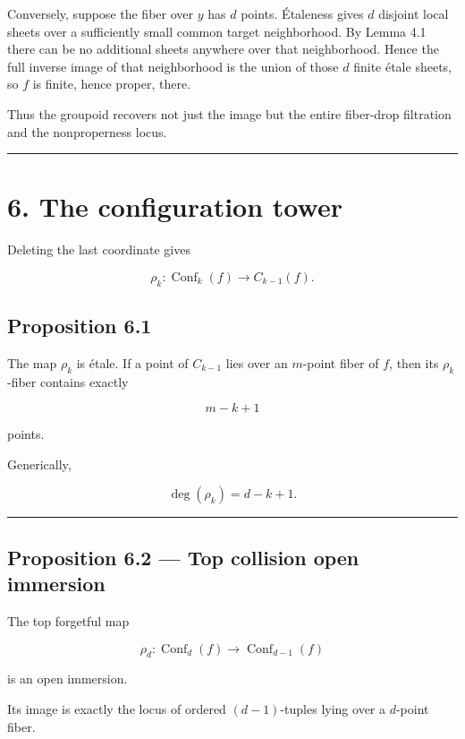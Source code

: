 Conversely, suppose the fiber over \(y\) has \(d\) points. Étaleness
gives \(d\) disjoint local sheets over a sufficiently small common
target neighborhood. By Lemma 4.1 there can be no additional sheets
anywhere over that neighborhood. Hence the full inverse image of that
neighborhood is the union of those \(d\) finite étale sheets, so \(f\)
is finite, hence proper, there.

Thus the groupoid recovers not just the image but the entire fiber-drop
filtration and the nonproperness locus.

\begin{center}\rule{0.5\linewidth}{0.5pt}\end{center}

\section{6. The configuration tower}\label{the-configuration-tower}

Deleting the last coordinate gives

\[
\rho_k\colon \operatorname{Conf}_k(f)\longrightarrow C_{k-1}(f).
\]

\subsection{Proposition 6.1}\label{proposition-6.1}

The map \(\rho_k\) is étale. If a point of \(C_{k-1}\) lies over an
\(m\)-point fiber of \(f\), then its \(\rho_k\)-fiber contains exactly

\[
m-k+1
\]

points.

Generically,

\[
\deg(\rho_k)=d-k+1.
\]

\begin{center}\rule{0.5\linewidth}{0.5pt}\end{center}

\subsection{Proposition 6.2 --- Top collision open
immersion}\label{proposition-6.2-top-collision-open-immersion}

The top forgetful map

\[
\rho_d\colon \operatorname{Conf}_d(f)\to \operatorname{Conf}_{d-1}(f)
\]

is an open immersion.

Its image is exactly the locus of ordered \((d-1)\)-tuples lying over a
\(d\)-point fiber.

